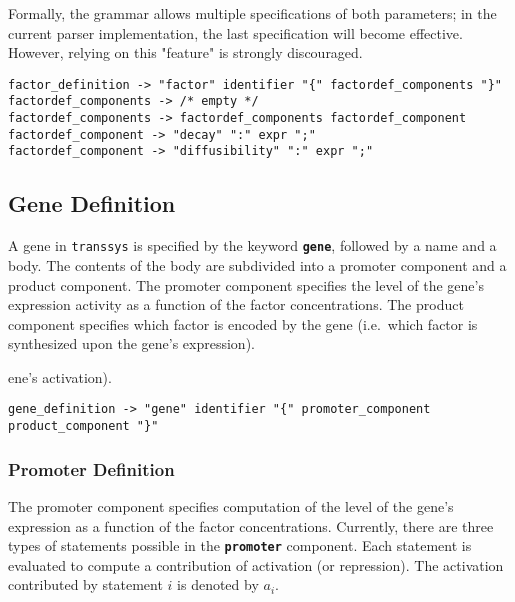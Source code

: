 \documentclass[12pt]{article}
\newcommand{\transsys}{\texttt{transsys}}
\newcommand{\keyword}[1]{\textbf{\texttt{#1}}}
\begin{document}
Formally, the grammar allows multiple specifications of both
parameters; in the current parser implementation, the last
specification will become effective. However, relying on this
"feature" is strongly discouraged.
\begin{footnotesize}
\begin{verbatim}
factor_definition -> "factor" identifier "{" factordef_components "}"
factordef_components -> /* empty */
factordef_components -> factordef_components factordef_component
factordef_component -> "decay" ":" expr ";"
factordef_component -> "diffusibility" ":" expr ";"
\end{verbatim}
\end{footnotesize}


\subsection{Gene Definition}

A gene in \transsys{} is specified by the keyword \keyword{gene},
followed by a name and a body. The contents of the body are subdivided
into a promoter component and a product component. The promoter
component specifies the level of the gene's expression activity as a
function of the factor concentrations. The product component specifies
which factor is encoded by the gene (i.e.\ which factor is synthesized
upon the gene's expression).
\begin{footnotesize}ene's activation).
\begin{verbatim}
gene_definition -> "gene" identifier "{" promoter_component product_component "}"
\end{verbatim}
\end{footnotesize}


\subsubsection{Promoter Definition}

The promoter component specifies computation of the level of the
gene's expression as a function of the factor concentrations.
Currently, there are three types of statements possible in the
\keyword{promoter} component. Each statement is evaluated to compute a
contribution of activation (or repression). The activation contributed
by statement $i$ is denoted by $a_i$.
\end{document}
